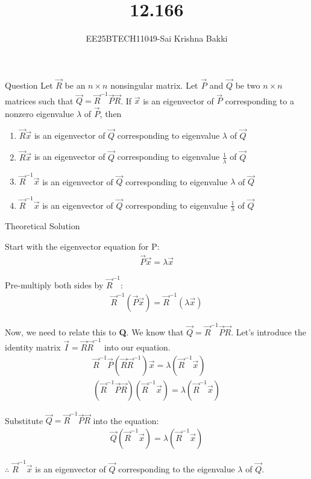 \documentclass{beamer}
\title %
{12.166}
\author 
{EE25BTECH11049-Sai Krishna Bakki}
\begin{document}
\frame{\titlepage}
\begin{frame}{Question}
Let $\vec{R}$ be an $n \times n$ nonsingular matrix. Let $\vec{P}$ and $\vec{Q}$ be two $n \times n$ matrices such that $\vec{Q} = \vec{R}^{-1}\vec{P}\vec{R}$. If $\vec{x}$ is an eigenvector of $\vec{P}$ corresponding to a nonzero eigenvalue $\lambda$ of $\vec{P}$, then
\begin{enumerate}[label=\alph*)]
    \item $\vec{R}\vec{x}$ is an eigenvector of $\vec{Q}$ corresponding to eigenvalue $\lambda$ of $\vec{Q}$
    \item $\vec{R}\vec{x}$ is an eigenvector of $\vec{Q}$ corresponding to eigenvalue $\frac{1}{\lambda}$ of $\vec{Q}$
    \item $\vec{R}^{-1}\vec{x}$ is an eigenvector of $\vec{Q}$ corresponding to eigenvalue $\lambda$ of $\vec{Q}$
    \item $\vec{R}^{-1}\vec{x}$ is an eigenvector of $\vec{Q}$ corresponding to eigenvalue $\frac{1}{\lambda}$ of $\vec{Q}$
\end{enumerate}
\end{frame}
\begin{frame}{Theoretical Solution}
    \begin{enumerate*}
    \item Start with the eigenvector equation for P:
    \begin{align}
    \vec{P}\vec{x} = \lambda \vec{x}
\end{align}
    \item Pre-multiply both sides by $\vec{R}^{-1}$:
    \begin{align} \vec{R}^{-1}(\vec{P}\vec{x}) = \vec{R}^{-1}(\lambda \vec{x}) 
    \end{align}
    \item Now, we need to relate this to \textbf{Q}. We know that $\vec{Q} = \vec{R}^{-1}\vec{P}\vec{R}$. Let's introduce the identity matrix $\vec{I} = \vec{R}\vec{R}^{-1}$ into our equation.
    \begin{align} \vec{R}^{-1}\vec{P}(\vec{R}\vec{R}^{-1})\vec{x} = \lambda(\vec{R}^{-1}\vec{x}) \\ (\vec{R}^{-1}\vec{P}\vec{R})(\vec{R}^{-1}\vec{x}) = \lambda(\vec{R}^{-1}\vec{x}) 
\end{align}
    \item Substitute $\vec{Q} = \vec{R}^{-1}\vec{P}\vec{R}$ into the equation:
    \begin{align} \vec{Q}(\vec{R}^{-1}\vec{x}) = \lambda(\vec{R}^{-1}\vec{x}) \end{align}
\end{enumerate*}

$\therefore$ $\vec{R}^{-1}\vec{x}$ is an eigenvector of $\vec{Q}$ corresponding to the eigenvalue $\lambda$ of $\vec{Q}$.
\end{frame}
\end{document}

